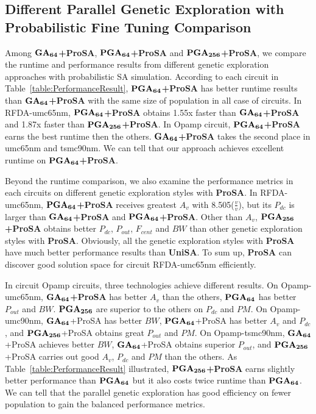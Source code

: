     \subsection{Different Parallel Genetic Exploration with Probabilistic Fine Tuning Comparison}\label{sec:ExPSProFT}

      Among {$\bf GA_{64}$\bf+ProSA}, {$\bf PGA_{64}$\bf+ProSA} and {$\bf PGA_{256}$\bf+ProSA}, we compare the runtime and performance results from different genetic exploration approaches with probabilistic SA simulation. According to each circuit in Table~\ref{table:PerformanceResult}, {$\bf PGA_{64}$\bf+ProSA} has better runtime results than {$\bf GA_{64}$\bf+ProSA} with the same size of population in all case of circuits. In RFDA-umc65nm, {$\bf PGA_{64}$\bf+ProSA} obtains 1.55x faster than {$\bf GA_{64}$\bf+ProSA} and 1.87x faster than {$\bf PGA_{256}$\bf+ProSA}. In Opamp circuit, {$\bf PGA_{64}$\bf+ProSA} earns the best runtime then the others. {$\bf GA_{64}$\bf+ProSA} takes the second place in umc65nm and tsmc90nm. We can tell that our approach achieves excellent runtime on {$\bf PGA_{64}$\bf+ProSA}.

      Beyond the runtime comparison, we also examine the performance metrics in each circuits on different genetic exploration styles with {\bf ProSA}. In RFDA-umc65nm, {$\bf PGA_{64}$\bf+ProSA} receives greatest $A_v$ with 8.505($\frac{v}{v}$), but its $P_{dc}$ is larger than {$\bf GA_{64}$\bf+ProSA} and {$\bf PGA_{64}$\bf+ProSA}. Other than $A_v$, {$\bf PGA_{256}$\bf+ProSA} obtains better $P_{dc}$, $P_{out}$, $F_{cent}$ and $BW$ than other genetic exploration styles with {\bf ProSA}. Obviously, all the genetic exploration styles with {\bf ProSA} have much better performance results than {\bf UniSA}. To sum up, {\bf ProSA} can discover good solution space for circuit RFDA-umc65nm efficiently. 

      In circuit Opamp circuits, three technologies achieve different results. On Opamp-umc65nm, {$\bf GA_{64}$\bf+ProSA} has better $A_v$ than the others, {$\bf PGA_{64}$} has better $P_{out}$ and $BW$. {$\bf PGA_{256}$} are superior to the others on $P_{dc}$ and $PM$. On Opamp-umc90nm, {$\bf GA_{64}$+ProSA} has better $BW$, {$\bf PGA_{64}$+ProSA} has better $A_v$ and $P_{dc}$, and {$\bf PGA_{256}$+ProSA} obtains great $P_{out}$ and $PM$. On Opamp-tsmc90nm, {$\bf GA_{64}$+ProSA} achieves better $BW$, {$\bf GA_{64}$+ProSA} obtains superior $P_{out}$, and {$\bf PGA_{256}$+ProSA} carries out good $A_v$, $P_{dc}$ and $PM$ than the others. As Table~\ref{table:PerformanceResult} illustrated, {$\bf PGA_{256}$\bf+ProSA} earns slightly better performance than $\bf PGA_{64}$ but it also costs twice runtime than $\bf PGA_{64}$. We can tell that the parallel genetic exploration has good efficiency on fewer population to gain the balanced performance metrics.


